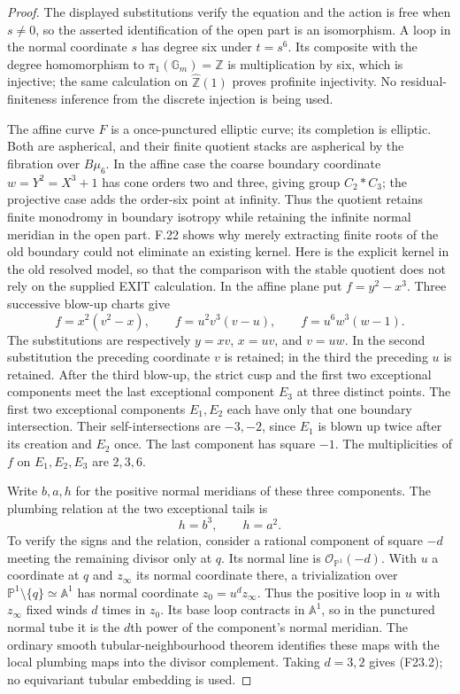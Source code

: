 \begin{proof}
The displayed substitutions verify the equation and the action is
free when $s\ne0$, so the asserted identification of the open part
is an isomorphism. A loop in the normal coordinate $s$ has degree six
under $t=s^6$. Its composite with the degree homomorphism to
$\pi_1(\mathbb G_m)=\mathbb Z$ is multiplication by six, which is
injective; the same calculation on $\widehat{\mathbb Z}(1)$ proves
profinite injectivity. No residual-finiteness inference from the
discrete injection is being used.

The affine curve $F$ is a once-punctured elliptic curve; its completion
is elliptic. Both are aspherical, and their finite quotient stacks
are aspherical by the fibration over $B\mu_6$. In the affine case
the coarse boundary coordinate $w=Y^2=X^3+1$ has cone orders two
and three, giving group $C_2*C_3$; the projective case adds the
order-six point at infinity. Thus the quotient retains finite
monodromy in boundary isotropy while retaining the infinite normal
meridian in the open part. F.22 shows why merely extracting finite
roots of the old boundary could not eliminate an existing kernel.
Here is the explicit kernel in the old resolved model, so that the
comparison with the stable quotient does not rely on the supplied
EXIT calculation. In the affine plane put $f=y^2-x^3$. Three successive
blow-up charts give
\[
 f=x^2(v^2-x),\qquad
 f=u^2v^3(v-u),\qquad
 f=u^6w^3(w-1).
 \tag{F23.1}
\]
The substitutions are respectively $y=xv$, $x=uv$, and $v=uw$.
In the second substitution the preceding coordinate $v$ is retained;
in the third the preceding $u$ is retained. After the third blow-up,
the strict cusp and the first two exceptional components meet the
last exceptional component $E_3$ at three distinct points. The first
two exceptional components $E_1,E_2$ each have only that one boundary
intersection. Their self-intersections are $-3,-2$, since $E_1$ is
blown up twice after its creation and $E_2$ once. The last component
has square $-1$. The multiplicities of $f$ on $E_1,E_2,E_3$ are
$2,3,6$.

Write $b,a,h$ for the positive normal meridians of these three
components. The plumbing relation at the two exceptional tails is
\[
                         h=b^3,\qquad h=a^2.              \tag{F23.2}
\]
To verify the signs and the relation, consider a rational component
of square $-d$ meeting the remaining divisor only at $q$.
Its normal line is $\mathcal O_{\mathbb P^1}(-d)$. With $u$ a
coordinate at $q$ and $z_\infty$ its normal coordinate there, a
trivialization over $\mathbb P^1\setminus\{q\}\simeq\mathbb A^1$
has normal coordinate $z_0=u^d z_\infty$. Thus the positive loop in
$u$ with $z_\infty$ fixed winds $d$ times in $z_0$. Its base loop
contracts in $\mathbb A^1$, so in the punctured normal tube it is
the $d$th power of the component's normal meridian. The ordinary
smooth tubular-neighbourhood theorem identifies these maps with
the local plumbing maps into the divisor complement. Taking
$d=3,2$ gives (F23.2); no equivariant tubular embedding is used.


\end{proof}

